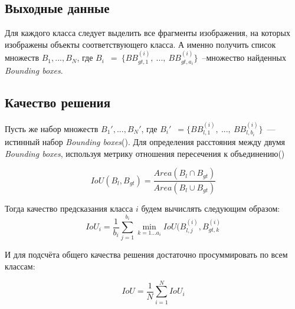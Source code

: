 \documentclass[12pt,twoside]{article}
\begin{document}
\subsection{Выходные данные}
Для каждого класса следует выделить все фрагменты изображения, на которых изображены объекты соответствующего класса. А именно получить список множеств $B_1, ..., B_N$, где $B_i$~$=~\{BB_{gt, 1}^{(i)},\  ...,\ BB_{gt, a_i}^{(i)}\}$~--множество найденных \textit{Bounding boxes}.
\subsection{Качество решения}
Пусть же набор множеств  $B_1', ..., B_N'$, где $B_i'$~$=\{BB_{l, 1}^{(i)},\ ...,\ BB_{l, b_i}^{(i)} \}$~--- истинный набор \textit{Bounding boxes}(\cite{metrics}). Для определения расстояния между двумя \textit{Bounding boxes}, используя метрику отношения пересечения к объединению(\cite{iou})

$$
IoU(B_l, B_{gt}) = \frac{Area(B_l \cap B_{gt})}{Area(B_l \cup B_{gt})}
$$

Тогда качество предсказания класса $i$ будем вычислять следующим образом:
$$
IoU_i = \frac{1}{b_i}\sum\limits_{j=1}^{b_i}\min\limits_{k=1...a_i}IoU(B_{l, j}^{(i)}, B_{gt, k}^{(i)}
$$

И для подсчёта общего качества решения достаточно просуммировать по всем классам:

$$
IoU = \frac{1}{N}\sum\limits_{i=1}^{N}IoU_i
$$

{}
   
\end{document}
